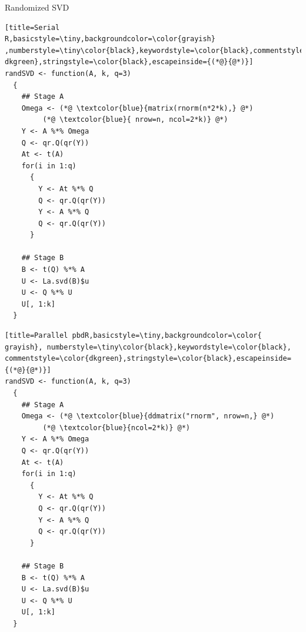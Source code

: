 \begin{frame}[fragile]
 \fontsize{8pt}{10}\selectfont
\begin{block}{Randomized SVD}
  \hspace{.1cm}
  \begin{minipage}{0.475\textwidth}
\begin{lstlisting}[title=Serial 
R,basicstyle=\tiny,backgroundcolor=\color{grayish} 
,numberstyle=\tiny\color{black},keywordstyle=\color{black},commentstyle=\color{ 
dkgreen},stringstyle=\color{black},escapeinside={(*@}{@*)}]
randSVD <- function(A, k, q=3)
  {
    ## Stage A
    Omega <- (*@ \textcolor{blue}{matrix(rnorm(n*2*k),} @*) 
         (*@ \textcolor{blue}{ nrow=n, ncol=2*k)} @*)
    Y <- A %*% Omega
    Q <- qr.Q(qr(Y))
    At <- t(A)
    for(i in 1:q)
      {
        Y <- At %*% Q
        Q <- qr.Q(qr(Y))
        Y <- A %*% Q
        Q <- qr.Q(qr(Y))
      }
    
    ## Stage B
    B <- t(Q) %*% A
    U <- La.svd(B)$u
    U <- Q %*% U
    U[, 1:k]
  }
\end{lstlisting}
  \end{minipage}
  \hspace{.05cm}
  \begin{minipage}{0.475\textwidth}
\begin{lstlisting}[title=Parallel pbdR,basicstyle=\tiny,backgroundcolor=\color{
grayish}, numberstyle=\tiny\color{black},keywordstyle=\color{black},
commentstyle=\color{dkgreen},stringstyle=\color{black},escapeinside={(*@}{@*)}]
randSVD <- function(A, k, q=3)
  {
    ## Stage A
    Omega <- (*@ \textcolor{blue}{ddmatrix("rnorm", nrow=n,} @*)
         (*@ \textcolor{blue}{ncol=2*k)} @*)
    Y <- A %*% Omega
    Q <- qr.Q(qr(Y))
    At <- t(A)      
    for(i in 1:q)
      {
        Y <- At %*% Q   
        Q <- qr.Q(qr(Y))
        Y <- A %*% Q    
        Q <- qr.Q(qr(Y))
      }
    
    ## Stage B
    B <- t(Q) %*% A     
    U <- La.svd(B)$u 
    U <- Q %*% U     
    U[, 1:k]
  }
\end{lstlisting}
  \end{minipage}
\end{block}
\end{frame}

